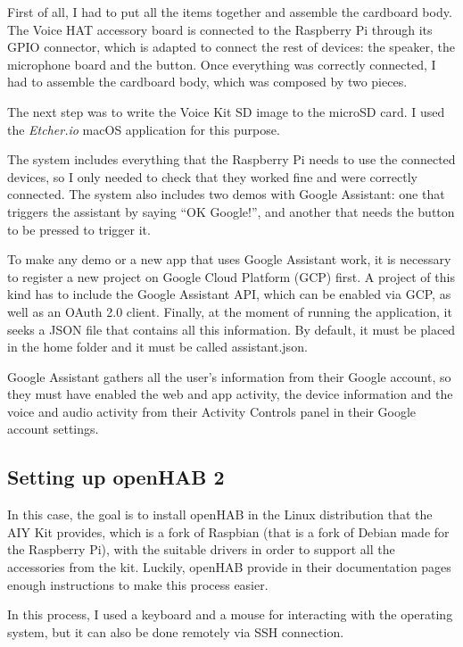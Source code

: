 First of all, I had to put all the items together and assemble the cardboard body. The Voice HAT accessory board is connected to the
Raspberry Pi through its GPIO connector, which is adapted to connect the rest of devices: the speaker, the microphone board and the
button. Once everything was correctly connected, I had to assemble the cardboard body, which was composed by two
pieces.\cite{aiyProjectsVoice}

The next step was to write the Voice Kit SD image\cite{voiceKitSdImage} to the microSD card. I used the \textit{Etcher.io} macOS
application for this purpose.

The system includes everything that the Raspberry Pi needs to use the connected devices, so I only needed to check that they worked
fine and were correctly connected. The system also includes two demos with Google Assistant: one that triggers the assistant by saying
“OK Google!”, and another that needs the button to be pressed to trigger it.

To make any demo or a new app that uses Google Assistant work, it is necessary to register a new project on Google Cloud Platform
(GCP) first. A project of this kind has to include the Google Assistant API, which can be enabled via GCP, as well as an OAuth 2.0
client. Finally, at the moment of running the application, it seeks a JSON file that contains all this information. By default, it
must be placed in the home folder and it must be called assistant.json.

Google Assistant gathers all the user’s information from their Google account, so they must have enabled the web and app activity,
the device information and the voice and audio activity from their Activity Controls panel in their Google account settings.

\subsection{Setting up openHAB 2}
In this case, the goal is to install openHAB in the Linux distribution that the AIY Kit provides, which is a fork of Raspbian
(that is a fork of Debian made for the Raspberry Pi), with the suitable drivers in order to support all the accessories from the kit.
Luckily, openHAB provide in their documentation pages\cite{openHABDocs} enough instructions to make this process easier.

In this process, I used a keyboard and a mouse for interacting with the operating system, but it can also be done remotely via
SSH connection.

